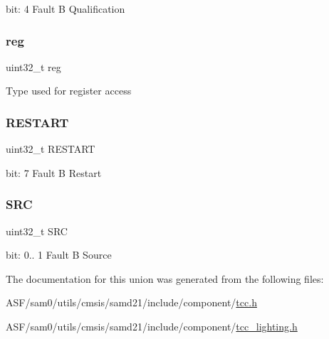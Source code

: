 bit\+: 4 Fault B Qualification \mbox{\label{union_t_c_c___f_c_t_r_l_b___type_a6b91636401516a477989a336376d7b40}} 
\subsubsection{\texorpdfstring{reg}{reg}}
{\footnotesize\ttfamily uint32\+\_\+t reg}

Type used for register access \mbox{\label{union_t_c_c___f_c_t_r_l_b___type_ab492835f5a772d02c85d8ce8370ff02e}} 
\subsubsection{\texorpdfstring{RESTART}{RESTART}}
{\footnotesize\ttfamily uint32\+\_\+t R\+E\+S\+T\+A\+RT}

bit\+: 7 Fault B Restart \mbox{\label{union_t_c_c___f_c_t_r_l_b___type_a306a1d33a25b1f2253b4b855b6e8c0d5}} 
\subsubsection{\texorpdfstring{SRC}{SRC}}
{\footnotesize\ttfamily uint32\+\_\+t S\+RC}

bit\+: 0.. 1 Fault B Source 

The documentation for this union was generated from the following files\+:\begin{DoxyCompactItemize}
\item 
A\+S\+F/sam0/utils/cmsis/samd21/include/component/\mbox{\hyperlink{tcc_8h}{tcc.\+h}}\item 
A\+S\+F/sam0/utils/cmsis/samd21/include/component/\mbox{\hyperlink{tcc__lighting_8h}{tcc\+\_\+lighting.\+h}}\end{DoxyCompactItemize}
